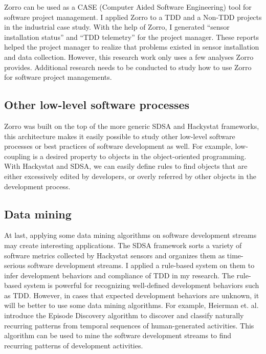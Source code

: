 Zorro can be used as a CASE (Computer Aided Software Engineering) tool for software project management. I applied Zorro to a TDD and a Non-TDD projects in the industrial case study. With the help of Zorro, I generated ``sensor installation status'' and ``TDD telemetry'' for the project manager. These reports helped the project manager to realize that problems existed in sensor installation and data collection. However, this research work only uses a few analyses Zorro provides. Additional research needs to be conducted to study how to use Zorro for software project managements.

\subsection{Other low-level software processes}
Zorro was built on the top of the more generic SDSA and Hackystat frameworks, this architecture makes it easily possible to study other low-level software processes or best practices of software development as well. For example, low-coupling is a desired property to objects in the object-oriented programming. With Hackystat and SDSA, we can easily define rules to find objects that are either excessively edited by developers, or overly referred by other objects in the development process. 

\subsection{Data mining}
At last, applying some data mining algorithms on software development streams may create interesting applications. The SDSA framework sorts a variety of software metrics collected by Hackystat sensors and organizes them as time-serious software development streams. I applied a rule-based system on them to infer development behaviors and compliance of TDD in my research. The rule-based system is powerful for recognizing well-defined development behaviors such as TDD. However, in cases that expected development behaviors are unknown, it will be better to use some data mining algorithms. For example, Heierman et. al. introduce the Episode Discovery \cite{Heierman04} algorithm to discover and classify naturally recurring patterns from temporal sequences of human-generated activities. This algorithm can be used to mine the software development streams to find recurring patterns of development activities.